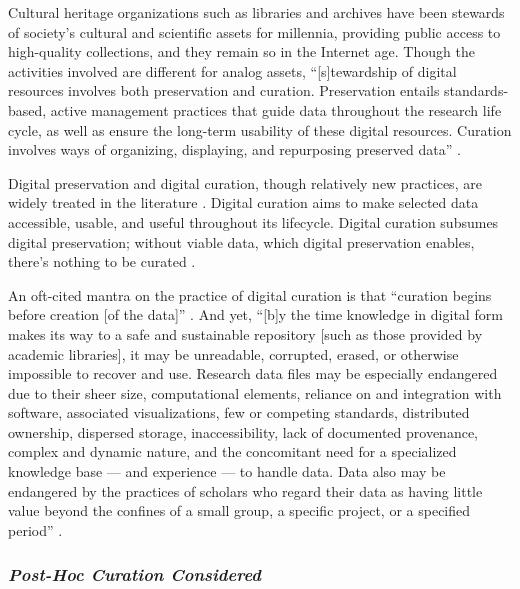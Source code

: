\documentclass[man,12pt,biblatex]{apa6}
\begin{document}
Cultural heritage organizations such as libraries and archives have
been stewards of society's cultural and scientific assets for
millennia, providing public access to high-quality collections, and
they remain so in the Internet age. Though the activities involved are
different for analog assets, ``[s]tewardship of digital resources
involves both preservation and curation. Preservation entails
standards-based, active management practices that guide data
throughout the research life cycle, as well as ensure the long-term
usability of these digital resources. Curation involves ways of
organizing, displaying, and repurposing preserved data''
\parencite{arl:stewardship}.

Digital preservation and digital curation, though relatively new
practices, are widely treated in the literature
\parencite{jisc:deluge,curry:community,goble:curation,ogburn:imperative,heidorn:libraries,williams:lifecycle,arl:stewardship}. Digital
curation aims to make selected data accessible, usable, and useful
throughout its lifecycle. Digital curation subsumes digital
preservation; without viable data, which digital preservation enables,
there's nothing to be curated .

An oft-cited mantra on the practice of digital curation is that
``curation begins before creation [of the data]''
\parencite{rusbridge:curation}. And yet, ``[b]y the time knowledge in
digital form makes its way to a safe and sustainable repository [such
  as those provided by academic libraries], it may be unreadable,
corrupted, erased, or otherwise impossible to recover and
use. Research data files may be especially endangered due to their
sheer size, computational elements, reliance on and integration with
software, associated visualizations, few or competing standards,
distributed ownership, dispersed storage, inaccessibility, lack of
documented provenance, complex and dynamic nature, and the concomitant
need for a specialized knowledge base --- and experience --- to handle
data.  Data also may be endangered by the practices of scholars who
regard their data as having little value beyond the confines of a
small group, a specific project, or a specified period''
\parencite{ogburn:imperative}.

\subsubsection{\textit{Post-Hoc Curation Considered}}
\end{document}
